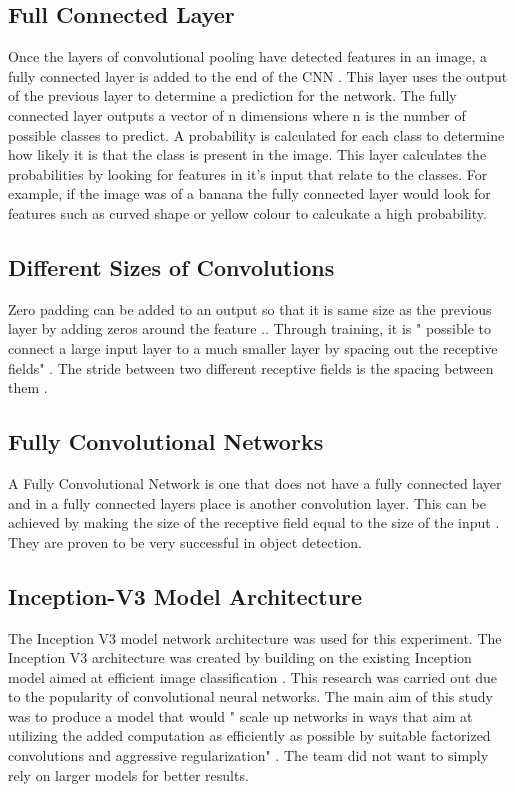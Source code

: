 \subsection*{Full Connected Layer}
Once the layers of convolutional pooling have detected features in an image, a fully connected layer is added to the end of the CNN \parencite{fullyConnectedLayer}.
This layer uses the output of the previous layer to determine a prediction for the network.
The fully connected layer outputs a vector of n dimensions where n is the number of possible classes to predict.
A probability is calculated for each class to determine how likely it is that the class is present in the image.
This layer calculates the probabilities by looking for features in it's input that relate to the classes.
For example, if the image was of a banana the fully connected layer would look for features such as curved shape or yellow colour to calcukate a high probability.

\subsection*{Different Sizes of Convolutions}
Zero padding can be added to an output so that it is same size as the previous layer by adding zeros around the feature \parencite{handsOnML}..
Through training, it is " possible to connect a large input layer to a much smaller layer by spacing out the receptive fields" \parencite{handsOnML}.
The stride between two different receptive fields is the spacing between them \parencite{handsOnML}.

\subsection*{Fully Convolutional Networks}
A Fully Convolutional Network is one that does not have a fully connected layer
and in a fully connected layers place is another convolution layer.
This can be achieved by making the size of the receptive field equal to the size of the input \parencite{digits}.
They are proven to be very successful in object detection.

\subsection*{Inception-V3 Model Architecture}
The Inception V3 model network architecture was used for this experiment. The
Inception V3 architecture was created by building on the existing Inception
model aimed at efficient image classification \parencite{rethinkingInception}.
This research was carried out due to the popularity of convolutional neural networks.
The main aim of this study was to produce a model that would " scale up networks in ways that aim at utilizing the added computation as efficiently as possible by suitable factorized convolutions and aggressive regularization" \parencite{rethinkingInception}.
The team did not want to simply rely on larger models for better results.

